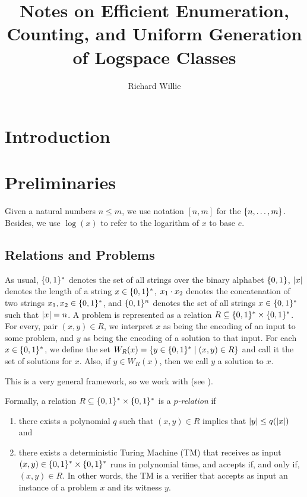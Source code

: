 \documentclass[11pt,twoside=off,numbers=noenddot]{scrbook}
\title{Notes on Efficient Enumeration, Counting, and Uniform Generation of Logspace Classes}
\author{Richard Willie}
\begin{document}
\maketitle

\tableofcontents

\newpage

\chapter{Introduction}

\chapter{Preliminaries}
Given a natural numbers $n \leq m$, we use notation $[n, m]$ for the $\{ n, \dots, m \}$. Besides, we use $\log(x)$ to refer to the logarithm of $x$ to base $e$.

\section{Relations and Problems}
As usual, $\{ 0, 1 \}^\ast$ denotes the set of all strings over the binary alphabet $\{ 0, 1 \}$, $| x |$ denotes the length of a string $x \in \{ 0, 1 \}^\ast$, $x_1 \cdot x_2$ denotes the concatenation of two strings $x_1, x_2 \in \{ 0, 1 \}^\ast$, and $\{ 0, 1 \}^n$ denotes the set of all strings $x \in \{ 0, 1 \}^\ast$ such that $| x | = n$. A problem is represented as a relation $R \subseteq \{ 0, 1 \}^\ast \times \{ 0, 1 \}^\ast$. For every, pair $(x, y) \in R$, we interpret $x$ as being the encoding of an input to some problem, and $y$ as being the encoding of a solution to that input. For each $x \in \{ 0, 1 \}^\ast$, we define the set $W_R(x) = \{ y \in \{ 0, 1 \}^\ast \mid (x, y) \in R \}$ and call it the set of solutions for $x$. Also, if $y \in W_R(x)$, then we call $y$ a solution to $x$.

This is a very general framework, so we work with  (see \cite{jerrum1986random}).

\begin{definition}[$p$-relation]
    Formally, a relation $R \subseteq \{ 0, 1 \}^\ast \times \{ 0, 1 \}^\ast$ is a \emph{$p$-relation} if
    \begin{enumerate}
        \item there exists a polynomial $q$ such that $(x, y) \in R$ implies that $| y | \leq q(| x |)$ and
        \item there exists a deterministic Turing Machine (TM) that receives as input $(x, y) \in \{ 0, 1 \}^\ast \times \{ 0, 1 \}^\ast$ runs in polynomial time, and accepts if, and only if, $(x, y) \in R$. In other words, the TM is a verifier that accepts as input an instance of a problem $x$ and its witness $y$.
    \end{enumerate}
\end{definition}
\end{document}
